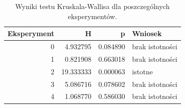 \begin{table}
\caption{Wyniki testu Kruskala-Wallisa dla poszczególnych eksperymentów.}
\label{tab:kruskal_exp}
\begin{tabular}{rrrl}
\toprule
Eksperyment & H & p & Wniosek \\
\midrule
0 & 4.932795 & 0.084890 & brak istotności \\
1 & 0.821908 & 0.663018 & brak istotności \\
2 & 19.333333 & 0.000063 & istotne \\
3 & 5.086716 & 0.078602 & brak istotności \\
4 & 1.068770 & 0.586030 & brak istotności \\
\bottomrule
\end{tabular}
\end{table}
